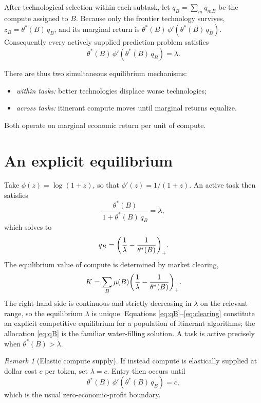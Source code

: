 \documentclass[11pt]{article}
\theoremstyle{definition}
\theoremstyle{remark}
\newtheorem{remark}{Remark}
\DeclarePairedDelimiter{\pos}{(}{)_{+}}
\begin{document}
After technological selection within each subtask, let $q_B = \sum_m q_{mB}$ be the compute assigned to $B$. Because only the frontier technology survives, $z_B = \theta^*(B)\, q_B$, and its marginal return is $\theta^*(B)\, \phi'\!\left(\theta^*(B)\, q_B\right)$. Consequently every actively supplied prediction problem satisfies
\begin{equation}
\label{eq:cross}
\theta^*(B)\, \phi'\!\left( \theta^*(B)\, q_B \right) = \lambda.
\end{equation}

There are thus two simultaneous equilibrium mechanisms:
\begin{itemize}[itemsep=2pt]
\item \emph{within tasks:} better technologies displace worse technologies;
\item \emph{across tasks:} itinerant compute moves until marginal returns equalize.
\end{itemize}
Both operate on marginal economic return per unit of compute.

\section{An explicit equilibrium}
\label{sec:explicit}

Take $\phi(z) = \log(1+z)$, so that $\phi'(z) = 1/(1+z)$. An active task then satisfies
\begin{equation}
\frac{\theta^*(B)}{1 + \theta^*(B)\, q_B} = \lambda,
\end{equation}
which solves to
\begin{equation}
\label{eq:qB}
q_B = \pos*{ \frac{1}{\lambda} - \frac{1}{\theta^*(B)} }.
\end{equation}
The equilibrium value of compute is determined by market clearing,
\begin{equation}
\label{eq:clearing}
K = \sum_B \mu(B) \pos*{ \frac{1}{\lambda} - \frac{1}{\theta^*(B)} }.
\end{equation}
The right-hand side is continuous and strictly decreasing in $\lambda$ on the relevant range, so the equilibrium $\lambda$ is unique. Equations \eqref{eq:qB}--\eqref{eq:clearing} constitute an explicit competitive equilibrium for a population of itinerant algorithms; the allocation \eqref{eq:qB} is the familiar water-filling solution. A task is active precisely when $\theta^*(B) > \lambda$.

\begin{remark}[Elastic compute supply]
If instead compute is elastically supplied at dollar cost $c$ per token, set $\lambda = c$. Entry then occurs until
\begin{equation}
\theta^*(B)\, \phi'\!\left( \theta^*(B)\, q_B \right) = c,
\end{equation}
which is the usual zero-economic-profit boundary.
\end{remark}
\end{document}
